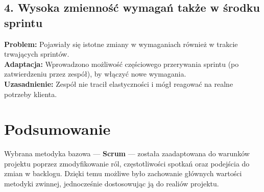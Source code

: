 \documentclass[12pt,a4paper,colorlinks=true,linkcolor=NavyBlue,citecolor=red,urlcolor=NavyBlue]{book}
\begin{document}
\subsection*{4. Wysoka zmienność wymagań także w środku sprintu}
\textbf{Problem:} Pojawiały się istotne zmiany w wymaganiach również w trakcie trwających sprintów.\\
\textbf{Adaptacja:} Wprowadzono możliwość częściowego przerywania sprintu (po zatwierdzeniu przez zespół), by włączyć nowe wymagania.\\
\textbf{Uzasadnienie:} Zespół nie tracił elastyczności i mógł reagować na realne potrzeby klienta.

\section{Podsumowanie}

Wybrana metodyka bazowa — \textbf{Scrum} — została zaadaptowana do warunków projektu poprzez zmodyfikowanie ról, częstotliwości spotkań oraz podejścia do zmian w backlogu. Dzięki temu możliwe było zachowanie głównych wartości metodyki zwinnej, jednocześnie dostosowując ją do realiów projektu.


\newpage
\thispagestyle{empty}
\null
\newpage

\end{document}
